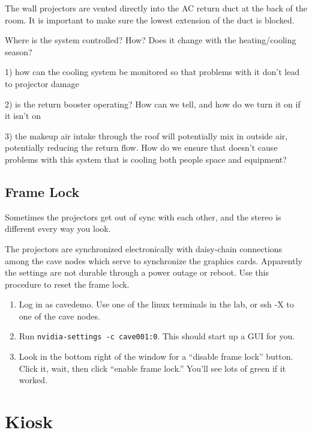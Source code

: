\documentclass[11pt]{article}
\begin{document}
The wall projectors are vented directly into the AC return duct at the
back of the room.  It is important to make sure the lowest extension
of the duct is blocked.

Where is the system controlled?  How?  Does it change with the
heating/cooling season?

1) how can the cooling system be monitored so that problems with it
don’t lead to projector damage

2) is the return booster operating?  How can we tell, and how do we
turn it on if it isn’t on

3) the makeup air intake through the roof will potentially mix in
outside air, potentially reducing the return flow.  How do we ensure
that doesn’t cause problems with this system that is cooling both
people space and equipment?


\subsection{Frame Lock}
\label{framelock}

Sometimes the projectors get out of sync with each other, and the
stereo is different every way you look.

The projectors are synchronized electronically with daisy-chain
connections among the cave nodes which serve to synchronize the
graphics cards.  Apparently the settings are not durable through a
power outage or reboot.  Use this procedure to reset the frame lock.

\begin{enumerate}

\item Log in as cavedemo.  Use one of the linux terminals in the lab,
  or ssh -X to one of the cave nodes.

\item Run \texttt{nvidia-settings -c cave001:0}.  This should start up
  a GUI for you.

\item Look in the bottom right of the window for a ``disable frame
  lock'' button.  Click it, wait, then click ``enable frame lock.''
  You'll see lots of green if it worked.

\end{enumerate}



\section{Kiosk}
\end{document}
